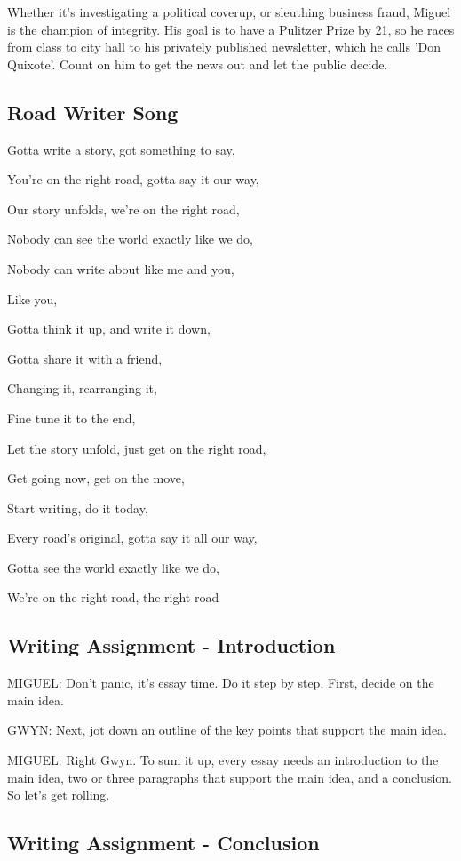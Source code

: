 Whether it's investigating a political coverup, or sleuthing business fraud, Miguel is the champion of integrity.
His goal is to have a Pulitzer Prize by 21, so he races from class to city hall to his privately published newsletter, which he calls 'Don Quixote'.
Count on him to get the news out and let the public decide.

\subsection{Road Writer Song}

Gotta write a story, got something to say,

You're on the right road, gotta say it our way,

Our story unfolds, we're on the right road,

Nobody can see the world exactly like we do,

Nobody can write about like me and you,

Like you,

Gotta think it up, and write it down,

Gotta share it with a friend,

Changing it, rearranging it,

Fine tune it to the end,

Let the story unfold, just get on the right road,

Get going now, get on the move,

Start writing, do it today,

Every road's original, gotta say it all our way,

Gotta see the world exactly like we do,

We're on the right road, the right road

\subsection{Writing Assignment - Introduction}

MIGUEL:
Don't panic, it's essay time.
Do it step by step.
First, decide on the main idea.

GWYN:
Next, jot down an outline of the key points that support the main idea.

MIGUEL:
Right Gwyn.
To sum it up, every essay needs an introduction to the main idea, two or three paragraphs that support the main idea, and a conclusion.
So let's get rolling.

\subsection{Writing Assignment - Conclusion}

